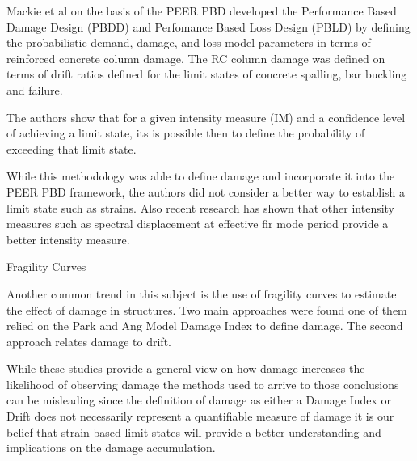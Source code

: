 Mackie et al \cite{Mackie2007} on the basis of the PEER PBD developed the Performance Based Damage Design (PBDD) and Perfomance Based Loss Design (PBLD) by defining the probabilistic demand, damage, and loss model parameters in terms of reinforced concrete column damage. The RC column damage was defined on terms of drift ratios defined for the limit states of concrete spalling, bar buckling and failure. 

The authors show that for a given intensity measure (IM) and a confidence level of achieving a limit state, its is possible then to define the probability  of exceeding that limit state.

While this methodology was able to define damage and incorporate it into the PEER PBD framework, the authors did not consider a better way to establish a limit state such as strains. Also recent research has shown that other intensity measures such as spectral displacement at effective fir mode period provide a better intensity measure.


Fragility Curves

Another common trend in this subject is the use of fragility curves to estimate the effect of damage in structures. Two main approaches were found one of them relied on the Park and Ang Model Damage Index to define damage. The second approach relates damage to drift.


While these studies provide a general view on how damage increases the likelihood of observing damage the methods used to arrive to those conclusions can be misleading since the definition of damage as either a Damage Index or Drift does not necessarily represent a quantifiable measure of damage it is our belief that strain based limit states will provide a better understanding and implications on the damage accumulation.